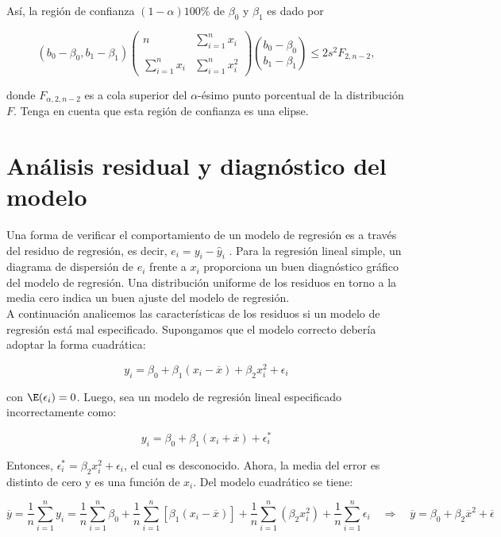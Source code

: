 Así, la región de confianza $(1-\alpha)100\%$ de $\beta_0$ y $\beta_1$ es dado por

\begin{tcolorbox}
$$
\left(b_0-\beta_0,b_1-\beta_1\right)
\left(
    \begin{array}{cc}
	n & \displaystyle\sum_{i=1}^n x_i\\\\
	\displaystyle\sum_{i=1}^n x_i & \displaystyle\sum_{i=1}^n x_i^2
    \end{array}
\right)
{b_0-\beta_0\choose b_1-\beta_1}
\leq 2s^2F_{2,n-2},
$$
\end{tcolorbox}

donde $F_{\alpha,2,n-2}$ es a cola superior del $\alpha$-ésimo punto porcentual de la distribución $F$. Tenga en cuenta que esta región de confianza es una elipse.


\section{Análisis residual y diagnóstico del modelo}
Una forma de verificar el comportamiento de un modelo de regresión es a través del residuo de regresión, es decir, $e_i = y_i - \hat{y}_i$ . Para la regresión lineal simple, un diagrama de dispersión de $e_i$ frente a $x_i$ proporciona un buen diagnóstico gráfico del modelo de regresión. Una distribución uniforme de los residuos en torno a la media cero indica un buen ajuste del modelo de regresión.\\

A continuación analicemos las características de los residuos si un modelo de regresión está mal especificado. Supongamos que el modelo correcto debería adoptar la forma cuadrática:

$$y_i=\beta_0+\beta_1\left(x_i-\overline{x}\right)+\beta_2x_i^2+\epsilon_i$$

con $\E(\epsilon_i)=0$.  Luego, sea un modelo de regresión lineal especificado incorrectamente como:

$$y_i=\beta_0+\beta_1\left(x_i+\overline{x}\right)+\epsilon_i^*$$

Entonces, $\epsilon_i^* = \beta_2x_i^2+\epsilon_i$, el cual es desconocido. Ahora, la media del error es distinto de cero y es una función de $x_i$. Del modelo cuadrático se tiene:

$$\overline{y}=\dfrac{1}{n}\sum\limits_{i=1}^n y_i=\dfrac{1}{n}\sum\limits_{i=1}^n \beta_0+\dfrac{1}{n}\sum\limits_{i=1}^n\left[\beta_1(x_i-\overline{x})\right]+\dfrac{1}{n}\sum\limits_{i=1}^n\left(\beta_2 x_i^2\right)+\dfrac{1}{n}\sum\limits_{i=1}^n \epsilon_i\quad \Rightarrow \quad \overline{y}=\beta_0+\beta_2\overline{x}^2+\overline{\epsilon}$$

